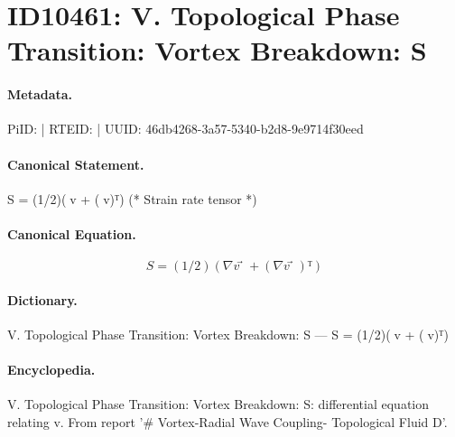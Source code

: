 \section*{ID10461: V. Topological Phase Transition: Vortex Breakdown: S}
\paragraph{Metadata.}
PiID:  | RTEID:  | UUID: 46db4268-3a57-5340-b2d8-9e9714f30eed

\paragraph{Canonical Statement.}
S = (1/2)(∇v⃗ + (∇v⃗)ᵀ) (* Strain rate tensor *)

\paragraph{Canonical Equation.}
\[
S = (1/2)(∇v⃗ + (∇v⃗)ᵀ)
\]

\paragraph{Dictionary.}
V. Topological Phase Transition: Vortex Breakdown: S — S = (1/2)(∇v⃗ + (∇v⃗)ᵀ)

\paragraph{Encyclopedia.}
V. Topological Phase Transition: Vortex Breakdown: S: differential equation relating v. From report '\# Vortex-Radial Wave Coupling- Topological Fluid D'.
